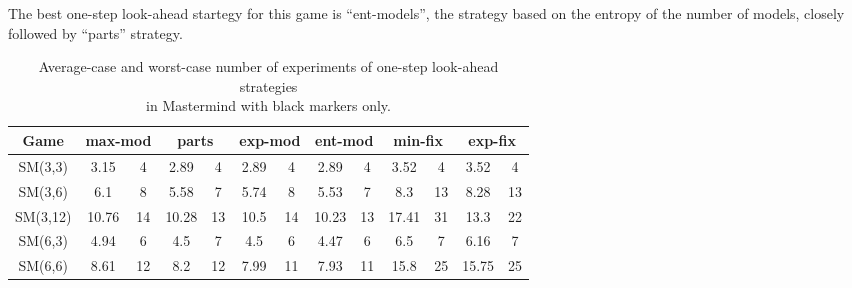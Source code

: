 The best one-step look-ahead startegy for this game is ``ent-models'',
  the strategy based on the entropy of the number of models,
  closely followed by ``parts'' strategy.

\begin{table}[ht]
\begin{center}
\begin{small}
\begin{tabular}{|c|c|c|c|c|c|c|c|c|c|c|c|c|}\hline
Game & \multicolumn{2}{c|}{max-mod} & \multicolumn{2}{c|}{parts}
& \multicolumn{2}{c|}{exp-mod} & \multicolumn{2}{c|}{ent-mod}
& \multicolumn{2}{c|}{min-fix} & \multicolumn{2}{c|}{exp-fix}\\ \hline
SM(3,3) & 3.15 &  4 &  2.89 & 4 & 2.89 & 4 & 2.89 & 4 & 3.52 &  4 & 3.52 &  4 \\
SM(3,6) & 6.1 &  8 &  5.58 & 7 & 5.74 & 8 & 5.53 & 7 & 8.3 & 13 &  8.28 &  13 \\
SM(3,12)& 10.76& 14 & 10.28 & 13& 10.5 & 14 & 10.23 & 13 &  17.41 & 31 &  13.3 &  22 \\ \hline
SM(6,3)& 4.94 &  6 &  4.5 & 7 & 4.5 & 6 & 4.47 &  6 & 6.5 & 7 & 6.16 &  7 \\
SM(6,6)& 8.61 & 12 &  8.2 & 12& 7.99 & 11 & 7.93 & 11 &  15.8 &  25 &  15.75 & 25 \\ \hline
\end{tabular}
\end{small}
\caption{Average-case and worst-case number of experiments
  of one-step look-ahead strategies \\ in Mastermind with black markers only.}
\label{tbl:exp-mmb}
\end{center}
\end{table}

